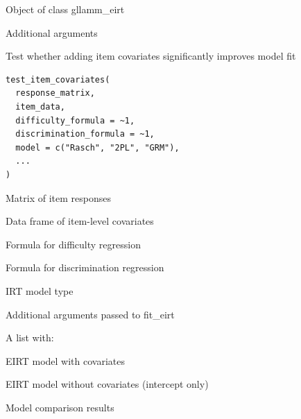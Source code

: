 \documentclass[a4paper]{book}
\begin{document}
%
\begin{Arguments}
\begin{ldescription}
\item[\code{object}] Object of class gllamm\_eirt

\item[\code{...}] Additional arguments
\end{ldescription}
\end{Arguments}
%
\begin{Description}
Test whether adding item covariates significantly improves model fit
\end{Description}
%
\begin{Usage}
\begin{verbatim}
test_item_covariates(
  response_matrix,
  item_data,
  difficulty_formula = ~1,
  discrimination_formula = ~1,
  model = c("Rasch", "2PL", "GRM"),
  ...
)
\end{verbatim}
\end{Usage}
%
\begin{Arguments}
\begin{ldescription}
\item[\code{response\_matrix}] Matrix of item responses

\item[\code{item\_data}] Data frame of item-level covariates

\item[\code{difficulty\_formula}] Formula for difficulty regression

\item[\code{discrimination\_formula}] Formula for discrimination regression

\item[\code{model}] IRT model type

\item[\code{...}] Additional arguments passed to fit\_eirt
\end{ldescription}
\end{Arguments}
%
\begin{Value}
A list with:
\begin{ldescription}
\item[\code{full\_model}] EIRT model with covariates
\item[\code{null\_model}] EIRT model without covariates (intercept only)
\item[\code{comparison}] Model comparison results
\end{ldescription}
\end{Value}
\end{document}
